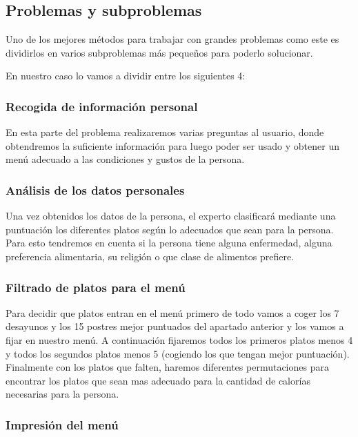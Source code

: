 \documentclass[11]{article}
\begin{document}
\subsection{Problemas y subproblemas}

Uno de los mejores métodos para trabajar con grandes problemas como este es dividirlos en varios subproblemas más pequeños para poderlo solucionar.

En nuestro caso lo vamos a dividir entre los siguientes 4:

\subsubsection{Recogida de información personal}

En esta parte del problema realizaremos varias preguntas al usuario, donde obtendremos la suficiente información para luego poder ser usado y obtener un menú adecuado a las condiciones y gustos de la persona.

\subsubsection{Análisis de los datos personales}

Una vez obtenidos los datos de la persona, el experto clasificará mediante una puntuación los diferentes platos según lo adecuados que sean para la persona. Para esto tendremos en cuenta si la persona tiene alguna enfermedad, alguna preferencia alimentaria, su religión o que clase de alimentos prefiere.

\subsubsection{Filtrado de platos para el menú}

Para decidir que platos entran en el menú primero de todo vamos a coger los 7 desayunos y los 15 postres mejor puntuados del apartado anterior y los vamos a fijar en nuestro menú. A continuación fijaremos todos los primeros platos menos 4 y todos los segundos platos menos 5 (cogiendo los que tengan mejor puntuación).
Finalmente con los platos que falten, haremos diferentes permutaciones para encontrar los platos que sean mas adecuado para la cantidad de calorías necesarias para la persona.

\subsubsection{Impresión del menú}
\end{document}

